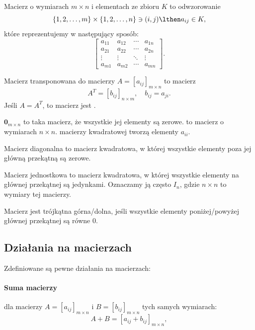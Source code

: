 \begin{definition}
    Macierz o wymiarach $m \times n$ i elementach ze zbioru $K$ to odwzorowanie
    \[ \{1, 2, \ldots, m\} \times \{1,2,\ldots,n\} \ni (i, j) \lthen a_{ij} \in K, \]
    które reprezentujemy w następujący sposób:
    \[ \begin{bmatrix}
        a_{11} & a_{12} & \cdots & a_{1n} \\
        a_{21} & a_{22} & \cdots & a_{2n} \\
        \vdots & \vdots & \ddots & \vdots \\
        a_{m1} & a_{m2} & \cdots & a_{mn}
    \end{bmatrix}. \]
\end{definition}

\begin{definition}
    Macierz transponowana do macierzy $A = [a_{ij}]_{m \times n}$ to macierz
    \[ A^T = [b_{ij}]_{n \times m}, \quad b_{ij} = a_{ji}. \]
    Jeśli $A = A^T$, to macierz jest .
\end{definition}

 $\mathbf{0}_{m\times n}$ to taka macierz, że wszystkie jej elementy są zerowe.  to macierz o wymiarach $n \times n$.  macierzy kwadratowej tworzą elementy $a_{ii}$.

\begin{definition}
    Macierz diagonalna to macierz kwadratowa, w której wszystkie elementy poza jej główną przekątną są zerowe.
\end{definition}

\begin{definition}
    Macierz jednostkowa to macierz kwadratowa, w której wszystkie elementy na głównej przekątnej są jedynkami. Oznaczamy ją często $I_n$, gdzie $n \times n$ to wymiary tej macierzy.
\end{definition}

\begin{definition}
    Macierz jest trójkątna górna/dolna, jeśli wszystkie elementy poniżej/powyżej głównej przekątnej są równe $0$.
\end{definition}

\subsection{Działania na macierzach}
Zdefiniowane są pewne działania na macierzach:

\paragraph{Suma macierzy} dla macierzy $A = [a_{ij}]_{m \times n}$ i $B = [b_{ij}]_{m \times n}$ tych samych wymiarach:
    \[ A + B = [a_{ij} + b_{ij}]_{m \times n}, \]
